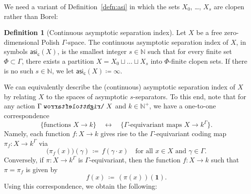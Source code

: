 \documentclass[11pt,reqno,psamsfonts]{amsart}
\theoremstyle{bfnote}
\theoremstyle{definition}
\newtheorem{defn}[theo]{Definition}
\theoremstyle{remark}
\newcommand{\0}{\varnothing}
\newcommand{\defeq}{\coloneqq}
\newcommand{\emphd}[1]{{\fontseries{b}\selectfont\textsf{#1}}}
\newcommand{\acts}{\mathrel{\reflectbox{$\righttoleftarrow$}}}
\newcommand{\G}{\Gamma}
\newcommand{\N}{\mathbb{N}}
\newcommand{\asi}{\mathsf{asi}}
\newcommand{\casi}{\asi_{\mathsf{c}}}
\newcommand{\iden}{\mathbf{1}}
\numberwithin{equation}{section}
\begin{document}
    We need %
    a variant of Definition~\ref{defn:asi} in which the sets $X_0$, \ldots, $X_s$ are %
    {clopen} rather than Borel:

    \begin{defn}[Continuous asymptotic separation index]\label{defn:casi}
        Let $X$ be a free zero-dimensional Polish $\G$-space. %
        The \emphd{continuous asymptotic separation index} of $X$, in symbols $\casi(X)$, is the smallest integer $s \in \N$ such that for every finite set $\Phi \subset \G$, there exists a partition $X = X_0 \sqcup \ldots \sqcup X_s$ into $\Phi$-finite clopen sets. If there is no such $s \in \N$, we let $\casi(X) \defeq \infty$.
    \end{defn}

    We can equivalently describe the (continuous) asymptotic separation index of $X$ by relating $X$ to the spaces of asymptotic $s$-separators. To this end, note that for any action $\G \acts X$ and $k \in \N^+$, we have a one-to-one correspondence
    \[
	    \big\{\text{functions $X \to k$}\big\} \quad \longleftrightarrow \quad \big\{\text{$\G$-equivariant maps $X \to k^\G$}\big\}.
	\]
	Namely, each function $f \colon X \to k$ gives rise to the $\G$-equivariant \emphd{coding map} $\pi_f \colon X \to k^\G$ via
	\[
	    \big(\pi_f(x)\big)(\gamma) \,\defeq\, f(\gamma \cdot x) \quad \text{for all } x \in X \text{ and } \gamma \in \G.
	\]
	Conversely, if $\pi \colon X \to k^\G$ is $\G$-equivariant, then the function %
    $f \colon X \to k$ such that $\pi = \pi_f$ is given by \[f(x) \,\defeq\, (\pi(x))(\iden).\]  %
    Using this correspondence, we obtain the following:
\end{document}

